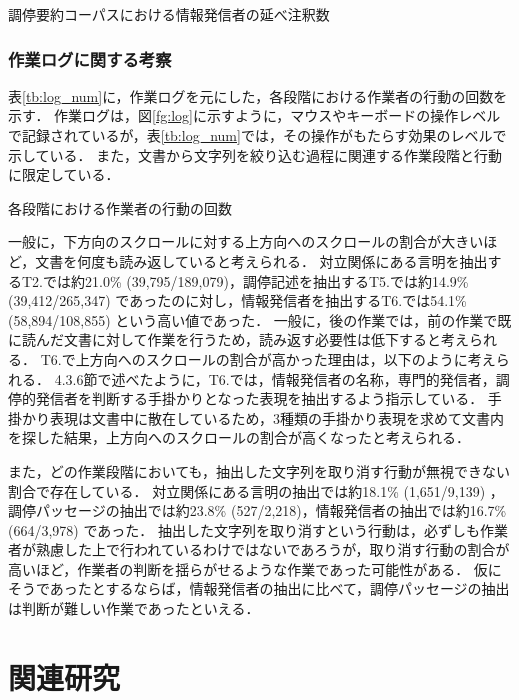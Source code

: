 \documentclass[japanese]{jnlp_1.4}
\begin{document}
\begin{table}[t]
 \caption{調停要約コーパスにおける情報発信者の延べ注釈数}
 \label{tb:MS_holder_result}

\end{table}


\subsubsection{作業ログに関する考察}

表\ref{tb:log_num}に，作業ログを元にした，各段階における作業者の行動の回数を示す．
作業ログは，図\ref{fg:log}に示すように，マウスやキーボードの操作レベルで記録されているが，表\ref{tb:log_num}では，その操作がもたらす効果のレベルで示している．
また，文書から文字列を絞り込む過程に関連する作業段階と行動に限定している．

\begin{table}[t]
 \caption{各段階における作業者の行動の回数}
 \label{tb:log_num}

\end{table}

一般に，下方向のスクロールに対する上方向へのスクロールの割合が大きいほど，文書を何度も読み返していると考えられる．
対立関係にある言明を抽出するT2.では約21.0\% (39,795/189,079)，調停記述を抽出するT5.では約14.9\% (39,412/265,347) であったのに対し，情報発信者を抽出するT6.では54.1\% (58,894/108,855) という高い値であった．
一般に，後の作業では，前の作業で既に読んだ文書に対して作業を行うため，読み返す必要性は低下すると考えられる．
T6.で上方向へのスクロールの割合が高かった理由は，以下のように考えられる．
4.3.6節で述べたように，T6.では，情報発信者の名称，専門的発信者，調停的発信者を判断する手掛かりとなった表現を抽出するよう指示している．
手掛かり表現は文書中に散在しているため，3種類の手掛かり表現を求めて文書内を探した結果，上方向へのスクロールの割合が高くなったと考えられる．

また，どの作業段階においても，抽出した文字列を取り消す行動が無視できない割合で存在している．
対立関係にある言明の抽出では約18.1\% (1,651/9,139) ，調停パッセージの抽出では約23.8\% (527/2,218)，情報発信者の抽出では約16.7\% (664/3,978) であった．
抽出した文字列を取り消すという行動は，必ずしも作業者が熟慮した上で行われているわけではないであろうが，取り消す行動の割合が高いほど，作業者の判断を揺らがせるような作業であった可能性がある．
仮にそうであったとするならば，情報発信者の抽出に比べて，調停パッセージの抽出は判断が難しい作業であったといえる．


\section{関連研究}
\label{sc:related_work}
\end{document}
